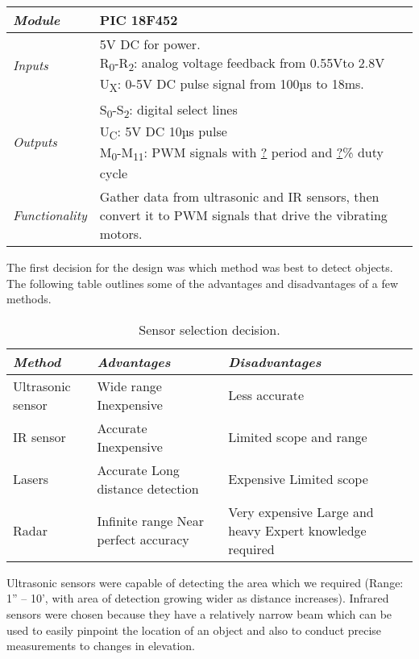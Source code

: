 \begin{table}[h]
\begin{tabular}{|m{2cm}|m{10cm}|} \hline
\emph{Module} & PIC 18F452 \\ \hline
\emph{Inputs} & \makecell[l]{
	\tabitem 5V DC for power.\\
	\tabitem R\textsubscript{0}-R\textsubscript{2}: analog voltage feedback from 0.55Vto 2.8V\\
	\tabitem U\textsubscript{X}: 0-5V DC pulse signal from 100µs to 18ms. }\\ \hline
\emph{Outputs} & \makecell[l]{
	\tabitem S\textsubscript{0}-S\textsubscript{2}: digital select lines\\
	\tabitem U\textsubscript{C}: 5V DC 10µs pulse\\
	\tabitem M\textsubscript{0}-M\textsubscript{11}: PWM signals with \ul{?} period and \ul{?}\% duty cycle }\\ \hline
\emph{Functionality} & Gather data from ultrasonic and IR sensors, then
convert it to PWM signals that drive the vibrating motors. \\ \hline
\end{tabular}
\end{table}

The first decision for the design was which method was best to detect
objects. The following table outlines some of the advantages and
disadvantages of a few methods.


\begin{table}[h]
\caption{Sensor selection decision.}
\label{table:caseStudySensorDecision}
\begin{tabular}{|m{4cm}|m{4cm}|m{4cm}|} \hline
\emph{\textbf{Method}} & \emph{\textbf{Advantages}} & \emph{\textbf{Disadvantages}} \\ \hline
Ultrasonic sensor & Wide range Inexpensive & Less accurate \\ \hline
IR sensor & Accurate Inexpensive & Limited scope and range \\ \hline
Lasers & Accurate Long distance detection & Expensive Limited scope \\ \hline
Radar & Infinite range Near perfect accuracy & Very expensive Large and heavy Expert knowledge required \\ \hline
\end{tabular}
\end{table}

Ultrasonic sensors were capable of detecting the area which we required
(Range: 1'' -- 10', with area of detection growing wider as distance
increases). Infrared sensors were chosen because they have a relatively
narrow beam which can be used to easily pinpoint the location of an
object and also to conduct precise measurements to changes in elevation.

